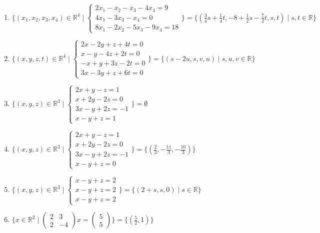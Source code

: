 \documentclass[11pt,a4paper]{article}
\begin{document}
\begin{enumerate}
\item $\displaystyle \{(x_{1}, x_{2}, x_{3}, x_{4}) \in \mathbb{R}^{4} \mid \begin{cases} 2x_{1} - x_{2} - x_{3} - 4x_{4} = 9 \\ 4x_{1} - 3x_{3} - x_{4} = 0 \\ 8x_{1} - 2x_{2} - 5x_{3} - 9x_{4} = 18 \end{cases}\} = \{(\frac{3}{4} s + \frac{1}{4} t, -8 + \frac{1}{2} s - \frac{7}{2} t, s, t) \mid s, t \in \mathbb{R}\}$
\item $\displaystyle \{(x, y, z, t) \in \mathbb{R}^{4} \mid \begin{cases} 2x - 2y + z + 4t = 0 \\ x - y - 4z + 2t = 0 \\ -x + y + 3z - 2t = 0 \\ 3x - 3y + z + 6t = 0 \end{cases}\} = \{(s - 2u, s, v, u) \mid s, u, v \in \mathbb{R}\}$
\item $\displaystyle \{(x, y, z) \in \mathbb{R}^{3} \mid \begin{cases} 2x + y - z = 1 \\ x + 2y - 2z = 0 \\ 3x - y + 2z = -1 \\ x - y + z = 1 \end{cases}\} = \emptyset$
\item $\displaystyle \{(x, y, z) \in \mathbb{R}^{3} \mid \begin{cases} 2x + y - z = 1 \\ x + 2y - 2z = 0 \\ 3x - y + 2z = -1 \\ x - y + z = 0 \end{cases}\} = \{(\frac{2}{3}, -\frac{11}{3}, -\frac{10}{3})\}$
\item $\displaystyle \{(x, y, z) \in \mathbb{R}^{3} \mid \begin{cases} x - y + z = 2 \\ x - y + z = 2 \\ x - y + z = 2 \end{cases}\} = \{(2 + s, s, 0) \mid s \in \mathbb{R}\}$
\item $\displaystyle \{x \in \mathbb{R}^{2} \mid \begin{pmatrix} 2 & 3 \\ 2 & -4 \end{pmatrix} x = \begin{pmatrix} 5 \\ 5 \end{pmatrix}\} = \{(\frac{5}{2}, 1)\}$

\end{enumerate}
\end{document}
